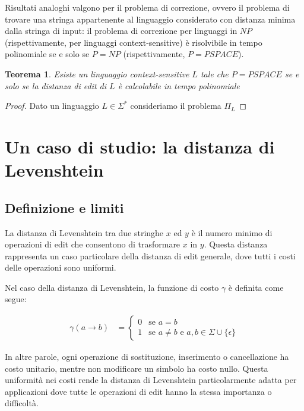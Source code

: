 \documentclass[a4paper,12pt]{report}
\newtheorem{theorem}{Teorema}[chapter]
\theoremstyle{propositionstyle}
\begin{document}
    Risultati analoghi valgono per il problema di correzione, ovvero il problema di trovare una stringa appartenente al linguaggio considerato con distanza minima dalla stringa di input: il problema di correzione per linguaggi in $NP$ (rispettivamente, per linguaggi context-sensitive) è risolvibile in tempo polinomiale se e solo se $P = NP$ (rispettivamente, $P = PSPACE$).

    \begin{theorem}
        Esiste un linguaggio context-sensitive $L$ tale che $P = PSPACE$ se e solo se la distanza di edit di $L$ è calcolabile in tempo polinomiale
    \end{theorem}
    \begin{proof}
        Dato un linguaggio $L \in \Sigma^*$ consideriamo il problema $\Pi_L$
    \end{proof}


    \chapter{Un caso di studio: la distanza di Levenshtein}

    \section{Definizione e limiti}

    La distanza di Levenshtein tra due stringhe $x$ ed $y$ è il numero minimo di operazioni di edit che consentono di trasformare $x$ in $y$. Questa distanza rappresenta un caso particolare della distanza di edit generale, dove tutti i costi delle operazioni sono uniformi.

    Nel caso della distanza di Levenshtein, la funzione di costo $\gamma$ è definita come segue:

    \begin{align}
        \gamma(a \rightarrow b) &= \begin{cases}
                                       0 & \text{se } a = b \\
                                       1 & \text{se } a \neq b \text{ e } a, b \in \Sigma \cup \{\epsilon\}
        \end{cases}
    \end{align}

    In altre parole, ogni operazione di sostituzione, inserimento o cancellazione ha costo unitario, mentre non modificare un simbolo ha costo nullo. Questa uniformità nei costi rende la distanza di Levenshtein particolarmente adatta per applicazioni dove tutte le operazioni di edit hanno la stessa importanza o difficoltà.
\end{document}
